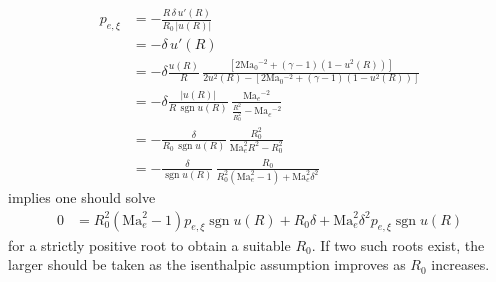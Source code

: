 \documentclass[letterpaper,11pt,nointlimits,reqno]{amsart}
\newcommand{\Mach}[1][]{\mbox{Ma}_{#1}}
\begin{document}
\begin{align}
  p_{e,\xi}
  &=
  - \frac{R \, \delta \, u'\!\left(R\right)}{R_0 \, \left|u\!\left(R\right)\right|}
\\&=
  - \delta \, u'\!\left(R\right)
\\&=
  - \delta
  \frac{u\!\left(R\right)}{R}
       \,
       \frac{
         \left[
               2 \Mach[0]{}^{-2}
             + \left(\gamma-1\right) \left(1 - u^2\!\left(R\right)\right)
         \right]
       }{
           2 u^2\!\left(R\right)
         - \left[
               2 \Mach[0]{}^{-2}
             + \left(\gamma-1\right) \left(1 - u^2\!\left(R\right)\right)
           \right]
       }
\\&=
  - \delta
  \frac{\left|u\!\left(R\right)\right|}{R \, \operatorname{sgn} u\!\left(R\right)}
       \,
       \frac{
           \Mach[e]{}^{-2}
       }{
           \frac{R^2}{R_0^2}
         - \Mach[e]{}^{-2}
       }
\\&=
  -
  \frac{\delta}{R_0 \, \operatorname{sgn} u\!\left(R\right)}
       \,
       \frac{ R_0^2 }{ \Mach[e]^2 R^2 - R_0^2 }
\\&=
  -
  \frac{\delta}{\operatorname{sgn} u\!\left(R\right)}
       \,
       \frac{ R_0 }{ R_0^2 \left(\Mach[e]^2 - 1\right) + \Mach[e]^2 \delta^2 }
\end{align}
implies one should solve
\begin{align}
  0
  &=
    R_0^2
    \left(\Mach[e]^2 - 1\right) p_{e,\xi} \operatorname{sgn} u\!\left(R\right)
  + R_0
    \delta
  + \Mach[e]^2 \delta^2 p_{e,\xi} \operatorname{sgn} u\!\left(R\right)
\end{align}
for a strictly positive root to obtain a suitable $R_0$.  If two such roots
exist, the larger should be taken as the isenthalpic assumption improves as
$R_0$ increases.
\end{document}
